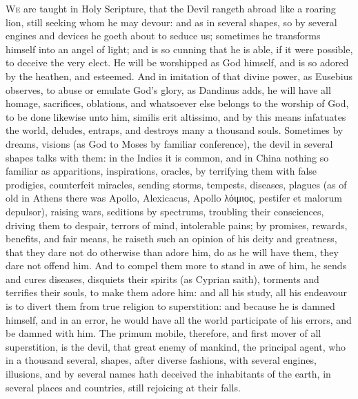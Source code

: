 {\lettrine{W}{e} are taught in Holy Scripture, that the Devil rangeth abroad like a
roaring lion, still seeking whom he may devour: and as in several
shapes, so by several engines and devices he goeth about to seduce us;
sometimes he transforms himself into an angel of light; and is so
cunning that he is able, if it were possible, to deceive the very
elect. He will be worshipped as God himself, and is so adored by
the heathen, and esteemed. And in imitation of that divine power, as
Eusebius observes, to abuse or emulate God's glory, as
Dandinus adds, he will have all homage, sacrifices, oblations, and
whatsoever else belongs to the worship of God, to be done likewise unto
him, similis erit altissimo, and by this means infatuates the world,
deludes, entraps, and destroys many a thousand souls. Sometimes by
dreams, visions (as God to Moses by familiar conference), the devil in
several shapes talks with them: in the Indies it is common, and
in China nothing so familiar as apparitions, inspirations, oracles, by
terrifying them with false prodigies, counterfeit miracles, sending
storms, tempests, diseases, plagues (as of old in Athens there was
Apollo, Alexicacus, Apollo \textgreek{λόιμιος}, pestifer et malorum depulsor),
raising wars, seditions by spectrums, troubling their consciences,
driving them to despair, terrors of mind, intolerable pains; by
promises, rewards, benefits, and fair means, he raiseth such an opinion
of his deity and greatness, that they dare not do otherwise than adore
him, do as he will have them, they dare not offend him. And to compel
them more to stand in awe of him, he sends and cures diseases,
disquiets their spirits (as Cyprian saith), torments and terrifies
their souls, to make them adore him: and all his study, all his
endeavour is to divert them from true religion to superstition: and
because he is damned himself, and in an error, he would have all the
world participate of his errors, and be damned with him. The primum
mobile, therefore, and first mover of all superstition, is the devil,
that great enemy of mankind, the principal agent, who in a thousand
several, shapes, after diverse fashions, with several engines,
illusions, and by several names hath deceived the inhabitants of the
earth, in several places and countries, still rejoicing at their falls.

}
